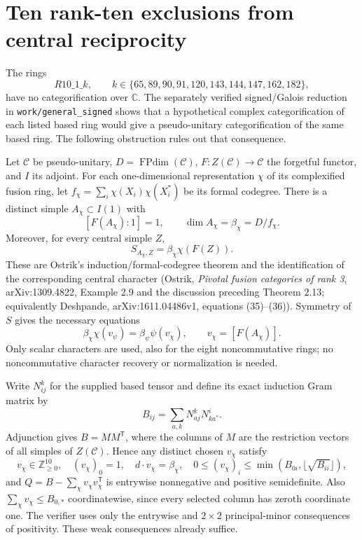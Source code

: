 \section{Ten rank-ten exclusions from central reciprocity}
The rings
\[
R10\_1\_k,\qquad
k\in\{65,89,90,91,120,143,144,147,162,182\},
\]
have no categorification over $\mathbb C$.
The separately verified signed/Galois reduction in \nolinkurl{work/general_signed}
shows that a hypothetical complex categorification of each listed based
ring would give a pseudo-unitary categorification of the same based ring.
The following obstruction rules out that consequence.

Let $\mathcal C$ be pseudo-unitary, $D=\operatorname{FPdim}(\mathcal C)$,
$F:Z(\mathcal C)\to\mathcal C$ the forgetful functor, and $I$ its adjoint.
For each one-dimensional representation $\chi$ of its complexified fusion
ring, let $f_\chi=\sum_i\chi(X_i)\chi(X_i^*)$ be its formal codegree.
There is a distinct simple $A_\chi\subset I(1)$ with
\[
[F(A_\chi):1]=1,\qquad
\dim A_\chi=\beta_\chi=D/f_\chi.
\]
Moreover, for every central simple $Z$,
\[
S_{A_\chi,Z}=\beta_\chi\chi(F(Z)).
\]
These are Ostrik's induction/formal-codegree theorem and the identification
of the corresponding central character (Ostrik, \emph{Pivotal fusion categories of rank 3},
arXiv:1309.4822, Example 2.9 and the discussion preceding
Theorem 2.13; equivalently Deshpande, arXiv:1611.04486v1, equations
(35)--(36)). Symmetry of $S$ gives the necessary equations
\begin{equation}\label{eq:r10reciprocity}
\beta_\chi\chi(v_\psi)=\beta_\psi\psi(v_\chi),
\qquad v_\chi=[F(A_\chi)].
\end{equation}
Only scalar characters are used, also for the eight noncommutative rings;
no noncommutative character recovery or normalization is needed.

Write $N_{ij}^k$ for the supplied based tensor and define its exact
induction Gram matrix by
\[
B_{ij}=\sum_{a,k}N_{aj}^kN_{ka^*}^{i}.
\]
Adjunction gives $B=MM^{\mathsf T}$, where the columns of $M$ are the
restriction vectors of all simples of $Z(\mathcal C)$. Hence any distinct
chosen $v_\chi$ satisfy
\[
 v_\chi\in\mathbb Z_{\ge0}^{10},\quad
(v_\chi)_0=1,\quad d\cdot v_\chi=\beta_\chi,
\quad 0\le(v_\chi)_i\le\min(B_{0i},\lfloor\sqrt{B_{ii}}\rfloor),
\]
and $Q=B-\sum_\chi v_\chi v_\chi^{\mathsf T}$ is entrywise nonnegative
and positive semidefinite. Also $\sum_\chi v_\chi\le B_{0,*}$
coordinatewise, since every selected column has zeroth coordinate one.
The verifier uses only the entrywise and $2\times2$ principal-minor
consequences of positivity. These weak consequences already suffice.

